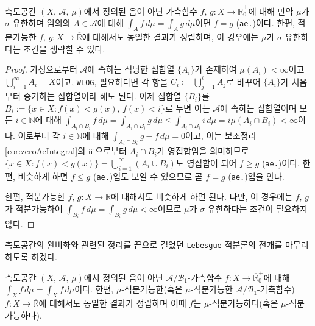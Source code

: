 \begin{theorem}\label{thm:twoFuncIntEqual}
    측도공간 $(X,\,\mathcal{A},\,\mu)$에서 정의된 음이 아닌 가측함수 $f,\,g:X\to\overline{\mathbb{R}}^+_0$에 대해 만약 $\mu$가 $\sigma$-유한하며 임의의 $A\in\mathcal{A}$에 대해 $\int_Af\,d\mu=\int_Ag\,d\mu$이면 $f=g$ (\texttt{ae.})이다. 한편, 적분가능한 $f,\,g:X\to\overline{\mathbb{R}}$에 대해서도 동일한 결과가 성립하며, 이 경우에는 $\mu$가 $\sigma$-유한하다는 조건을 생략할 수 있다.
\end{theorem}

\begin{proof}
    가정으로부터 $\mathcal{A}$에 속하는 적당한 집합열 $\{A_i\}$가 존재하여 $\mu(A_i)<\infty$이고 $\bigcup_{i=1}^\infty A_i=X$이고, \texttt{WLOG}, 필요하다면 각 항을 $C_i:=\bigcup_{j=1}^iA_j$로 바꾸어 $\{A_i\}$가 처음부터 증가하는 집합열이라 해도 된다. 이제 집합열 $\{B_i\}$를 $B_i:=\{x\in X:f(x)<g(x),\,f(x)<i\}$로 두면 이는 $\mathcal{A}$에 속하는 집합열이며 모든 $i\in\mathbb{N}$에 대해 $\int_{A_i\cap B_i}f\,d\mu=\int_{A_i\cap B_i}g\,d\mu\leq\int_{A_i\cap B_i}i\,d\mu=i\mu(A_i\cap B_i)<\infty$이다. 이로부터 각 $i\in\mathbb{N}$에 대해 $\int_{A_i\cap B_i}g-f\,d\mu=0$이고, 이는 보조정리 \ref{cor:zeroAeIntegral}의 iii으로부터 $A_i\cap B_i$가 영집합임을 의미하므로 $\{x\in X:f(x)<g(x)\}=\bigcup_{i=1}^\infty(A_i\cup B_i)$도 영집합이 되어 $f\geq g$ (\texttt{ae.})이다. 한편, 비슷하게 하면 $f\leq g$ (\texttt{ae.})임도 보일 수 있으므로 곧 $f=g$ (\texttt{ae.})임을 안다.

    한편, 적분가능한 $f,\,g:X\to\overline{\mathbb{R}}$에 대해서도 비슷하게 하면 된다. 다만, 이 경우에는 $f,\,g$가 적분가능하여 $\int_{B_i}f\,d\mu=\int_{B_i}g\,d\mu<\infty$이므로 $\mu$가 $\sigma$-유한하다는 조건이 필요하지 않다.
\end{proof}

측도공간의 완비화와 관련된 정리를 끝으로 길었던 \texttt{Lebesgue} 적분론의 전개를 마무리하도록 하겠다.

\begin{theorem}\label{thm:measureCompletionInt}
    측도공간 $(X,\,\mathcal{A},\,\mu)$에서 정의된 음이 아닌 $\mathcal{A}/\mathcal{B}_1$-가측함수 $f:X\to\overline{\mathbb{R}}^+_0$에 대해 $\int_Xf\,d\mu=\int_Xf\,d\overline{\mu}$이다. 한편, $\mu$-적분가능한(혹은 $\overline{\mu}$-적분가능한 $\mathcal{A}/\mathcal{B}_1$-가측함수) $f:X\to\overline{\mathbb{R}}$에 대해서도 동일한 결과가 성립하며 이때 $f$는 $\overline{\mu}$-적분가능하다(혹은 $\mu$-적분가능하다).
\end{theorem}

